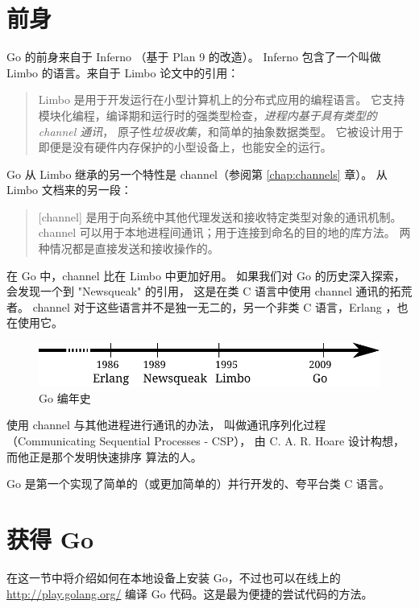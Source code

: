 \section{前身}
Go 的前身来自于 Inferno \cite{inferno} （基于 Plan 9 \cite{plan9} 的改造）。
Inferno 包含了一个叫做 Limbo \cite{limbo} 的语言。来自于 Limbo 论文中的引用：
\begin{quote}
Limbo 是用于开发运行在小型计算机上的分布式应用的编程语言。
它支持模块化编程，编译期和运行时的强类型检查，\emph{进程内基于具有类型的 channel 通讯}，
原子性\emph{垃圾收集}，和简单的抽象数据类型。
它被设计用于即便是没有硬件内存保护的小型设备上，也能安全的运行。
\end{quote}
Go 从 Limbo 继承的另一个特性是 channel（参阅第 \ref{chap:channels} 章）。
从 Limbo 文档来的另一段：
\begin{quote}
[channel] 是用于向系统中其他代理发送和接收特定类型对象的通讯机制。
channel 可以用于本地进程间通讯；用于连接到命名的目的地的库方法。
两种情况都是直接发送和接收操作的。
\end{quote}
在 Go 中，channel 比在 Limbo 中更加好用。
如果我们对 Go 的历史深入探索，会发现一个到 "Newsqueak" \cite{newsqueak} 的引用，
这是在类 C 语言中使用 channel 通讯的拓荒者。
channel 对于这些语言并不是独一无二的，另一个非类 C 语言，Erlang \cite{erlang}，也在使用它。

\begin{figure}[H]
\caption{Go 编年史}
\label{fig:chrono-of-go}
\begin{center}
\includegraphics[scale=0.65]{fig/go-history.pdf}
\end{center}
\end{figure}

使用 channel 与其他进程进行通讯的办法，
叫做通讯序列化过程（Communicating Sequential Processes - CSP），
由 C. A. R. Hoare \cite{hoare} 设计构想，而他正是那个发明快速排序 \cite{quicksort} 算法的人。

\begin{lbar}[]
Go 是第一个实现了简单的（或更加简单的）并行开发的、夸平台类 C 语言。
\end{lbar}

\section{获得 Go}
在这一节中将介绍如何在本地设备上安装 Go，不过也可以在线上的 \url{http://play.golang.org/} 编译 Go 代码。这是最为便捷的尝试代码的方法。

